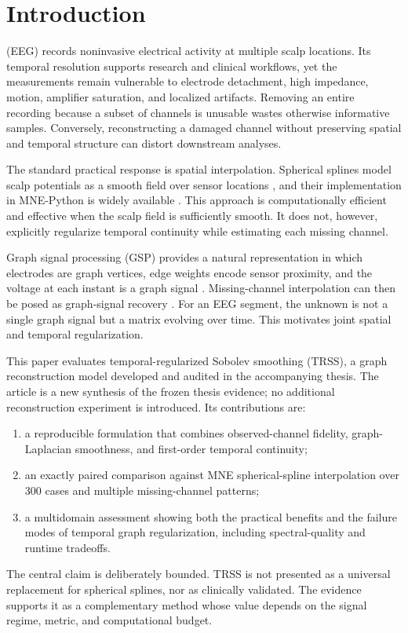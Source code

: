\section{Introduction}
 (EEG) records noninvasive electrical activity at multiple scalp locations. Its temporal resolution supports research and clinical workflows, yet the measurements remain vulnerable to electrode detachment, high impedance, motion, amplifier saturation, and localized artifacts. Removing an entire recording because a subset of channels is unusable wastes otherwise informative samples. Conversely, reconstructing a damaged channel without preserving spatial and temporal structure can distort downstream analyses.

The standard practical response is spatial interpolation. Spherical splines model scalp potentials as a smooth field over sensor locations \cite{perrin1989}, and their implementation in MNE-Python is widely available \cite{gramfort2013meg,gramfort2014mne}. This approach is computationally efficient and effective when the scalp field is sufficiently smooth. It does not, however, explicitly regularize temporal continuity while estimating each missing channel.

Graph signal processing (GSP) provides a natural representation in which electrodes are graph vertices, edge weights encode sensor proximity, and the voltage at each instant is a graph signal \cite{shuman2013,ortega2018}. Missing-channel interpolation can then be posed as graph-signal recovery \cite{narang2013}. For an EEG segment, the unknown is not a single graph signal but a matrix evolving over time. This motivates joint spatial and temporal regularization.

This paper evaluates temporal-regularized Sobolev smoothing (TRSS), a graph reconstruction model developed and audited in the accompanying thesis. The article is a new synthesis of the frozen thesis evidence; no additional reconstruction experiment is introduced. Its contributions are:
\begin{enumerate}
    \item a reproducible formulation that combines observed-channel fidelity, graph-Laplacian smoothness, and first-order temporal continuity;
    \item an exactly paired comparison against MNE spherical-spline interpolation over 300 cases and multiple missing-channel patterns;
    \item a multidomain assessment showing both the practical benefits and the failure modes of temporal graph regularization, including spectral-quality and runtime tradeoffs.
\end{enumerate}

The central claim is deliberately bounded. TRSS is not presented as a universal replacement for spherical splines, nor as clinically validated. The evidence supports it as a complementary method whose value depends on the signal regime, metric, and computational budget.
